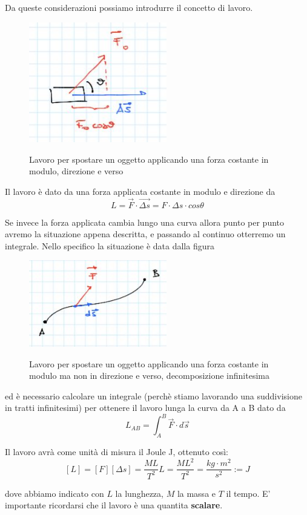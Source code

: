 Da queste considerazioni possiamo introdurre il concetto di lavoro.
\begin{figure}[h!]
	\begin{center}
		\includegraphics[width=6cm]{lezione7/images/1Precorsolavoroedenergia}\\
		\caption{Lavoro per spostare un oggetto applicando una forza costante in modulo, direzione e verso}
	\end{center}
\end{figure}
\begin{definizione}
	
	Il lavoro è dato da una forza applicata costante in modulo e direzione da 
	$$L=\vec{F}\cdot \vec{\Delta s}=F\cdot \Delta s \cdot cos \theta$$
	
Se invece la forza applicata cambia lungo una curva allora punto per punto avremo la situazione appena descritta, e passando al continuo otterremo un integrale. Nello specifico la situazione è data dalla figura 
	\begin{figure}[h!]
	\begin{center}
		\includegraphics[width=6cm]{lezione7/images/2Precorsolavoroedenergia}\\
		\caption{Lavoro per spostare un oggetto applicando una forza costante in modulo ma non in direzione e verso, decomposizione infinitesima}
	\end{center}
\end{figure}

ed è necessario calcolare un integrale (perchè stiamo lavorando una suddivisione in tratti infinitesimi) per ottenere il lavoro lunga la curva da A a B dato da 
$$L_{AB}=\int_{A}^{B} \vec{F} \cdot d \vec{s}$$ 

Il lavoro avrà come unità di misura il Joule J, ottenuto così:
$$[L]=[F][\Delta s] = \frac{ML}{T^2} L= \frac{ML^2}{T^2} = \frac{kg \cdot m^2}{s^2}:=J$$

dove abbiamo indicato con $L$ la lunghezza, $M$ la massa e $T$ il tempo. E' importante ricordarsi che il lavoro è una quantita \textbf{scalare}.
\end{definizione}

